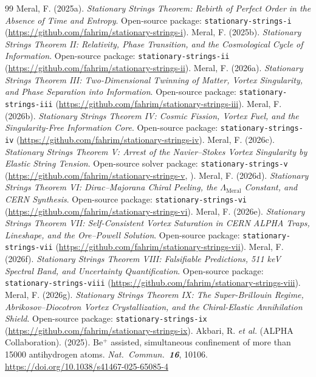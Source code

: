 \documentclass[12pt,a4paper]{article}
\begin{document}
\begin{thebibliography}{99}
     Meral, F. (2025a). \textit{Stationary Strings Theorem: Rebirth of Perfect Order in the Absence of Time and Entropy}. Open-source package: \texttt{stationary-strings-i} (\url{https://github.com/fahrim/stationary-strings-i}).
     Meral, F. (2025b). \textit{Stationary Strings Theorem II: Relativity, Phase Transition, and the Cosmological Cycle of Information}. Open-source package: \texttt{stationary-strings-ii} (\url{https://github.com/fahrim/stationary-strings-ii}).
     Meral, F. (2026a). \textit{Stationary Strings Theorem III: Two-Dimensional Twinning of Matter, Vortex Singularity, and Phase Separation into Information}. Open-source package: \texttt{stationary-strings-iii} (\url{https://github.com/fahrim/stationary-strings-iii}).
     Meral, F. (2026b). \textit{Stationary Strings Theorem IV: Cosmic Fission, Vortex Fuel, and the Singularity-Free Information Core}. Open-source package: \texttt{stationary-strings-iv} (\url{https://github.com/fahrim/stationary-strings-iv}).
     Meral, F. (2026c). \textit{Stationary Strings Theorem V: Arrest of the Navier--Stokes Vortex Singularity by Elastic String Tension}. Open-source solver package: \texttt{stationary-strings-v} (\url{https://github.com/fahrim/stationary-strings-v}, ).
     Meral, F. (2026d). \textit{Stationary Strings Theorem VI: Dirac--Majorana Chiral Peeling, the $\Lambda_{\mathrm{Meral}}$ Constant, and CERN Synthesis}. Open-source package: \texttt{stationary-strings-vi} (\url{https://github.com/fahrim/stationary-strings-vi}).
     Meral, F. (2026e). \textit{Stationary Strings Theorem VII: Self-Consistent Vortex Saturation in CERN ALPHA Traps, Lineshape, and the Ore--Powell Solution}. Open-source package: \texttt{stationary-strings-vii} (\url{https://github.com/fahrim/stationary-strings-vii}).
     Meral, F. (2026f). \textit{Stationary Strings Theorem VIII: Falsifiable Predictions, 511 keV Spectral Band, and Uncertainty Quantification}. Open-source package: \texttt{stationary-strings-viii} (\url{https://github.com/fahrim/stationary-strings-viii}).
     Meral, F. (2026g). \textit{Stationary Strings Theorem IX: The Super-Brillouin Regime, Abrikosov--Diocotron Vortex Crystallization, and the Chiral-Elastic Annihilation Shield}. Open-source package: \texttt{stationary-strings-ix} (\url{https://github.com/fahrim/stationary-strings-ix}).
     Akbari, R. \textit{et al.} (ALPHA Collaboration). (2025). Be$^+$ assisted, simultaneous confinement of more than 15000 antihydrogen atoms. \textit{Nat.\ Commun.\ \textbf{16}}, 10106. \url{https://doi.org/10.1038/s41467-025-65085-4}

\end{thebibliography}
\end{document}
